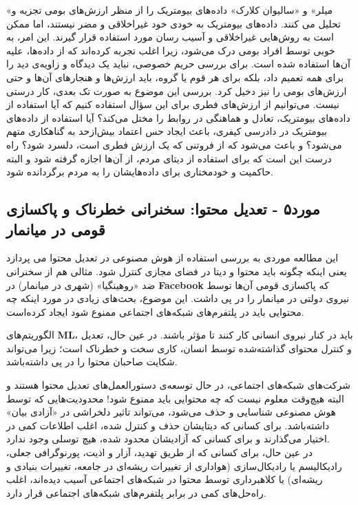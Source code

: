 «میلر» و «سالیوان کلارک» داده‌های بیومتریک را از منظر ارزش‌های بومی تجزیه و تحلیل می کنند.
داده‌های بیومتریک به خودی خود غیراخلاقی و مضر نیستند، اما ممکن است به روش‌هایی غیراخلاقی و آسیب رسان مورد استفاده قرار گیرند.
این امر، به خوبی توسط افراد بومی درک می‌شود، زیرا اغلب تجربه کرده‌اند که از داده‌ها، علیه آن‌ها استفاده شده است.
برای بررسی حریم خصوصی، نباید یک دیدگاه و زاویه‌ی دید را برای همه تعمیم داد، بلکه برای هر قوم یا گروه، باید ارزش‌ها و هنجارهای آن‌ها و حتی ارزش‌های بومی را نیز دخیل کرد.
بررسی این موضوع به صورت تک بعدی، کار درستی نیست.
می‌توانیم از ارزش‌های فطری برای این سؤال استفاده کنیم که آیا استفاده از داده‌های بیومتریک، تعادل و هماهنگی در روابط را مختل می‌کند؟ آیا استفاده از داده‌های بیومتریک در دادرسی کیفری، باعث ایجاد حس اعتماد بیش‌ازحد به گناهکاری متهم می‌شود؟ و باعث می‌شود که از فروتنی که یک ارزش فطری است، دلسرد شود؟ راه درست این است که برای استفاده از دیتای مردم، از آن‌ها اجازه گرفته شود و البته حاکمیت و خودمختاری برای داده‌هایشان را به مردم برگردانده شود.
\newline
\newline

{
\subsection*{مورد۵ - تعدیل محتوا: سخنرانی خطرناک و پاکسازی قومی در میانمار}
\label{subsec:مورد۵ - تعدیل محتوا: سخنرانی خطرناک و پاکسازی قومی در میانمار}
این مطالعه موردی به بررسی استفاده از هوش مصنوعی در تعدیل محتوا می پردازد یعنی اینکه چگونه باید محتوا و دیتا در فضای مجازی کنترل شود.
مثالی هم از سخنرانی ضد «روهینگیا» (شهری در میانمار) در \textenglish{\textbf{Facebook}} که پاکسازی قومی آن‌ها توسط نیروی دولتی در میانمار را در پی داشت.
این موضوع، بحث‌های زیادی در مورد اینکه چه محتوایی باید در پلتفرم‌های شبکه‌های اجتماعی ممنوع شود ایجاد کرده‌است.
}

الگوریتم‌های \textenglish{\textbf{ML}}، باید در کنار نیروی انسانی کار کنند تا مؤثر باشند.
در عین حال، تعدیل و کنترل محتوای گذاشته‌شده توسط انسان، کاری سخت و خطرناک است؛ زیرا می‌تواند شکایت صاحبان محتوا را در پی داشته‌باشد.

شرکت‌های شبکه‌های اجتماعی، در حال توسعه‌ی دستورالعمل‌های تعدیل محتوا هستند و البته هیچ‌وقت معلوم نیست که چه محتوایی باید ممنوع شود!
محدودیت‌هایی که توسط هوش مصنوعی شناسایی و حذف می‌شود، می‌تواند تاثیر دلخراشی در «آزادی بیان» داشته‌باشد.
برای کسانی که دیتایشان حذف و کنترل شده، اغلب اطلاعات کمی در اختیار می‌گذارند و برای کسانی که آزادیشان محدود شده، هیچ توسلی وجود ندارد.
\\
در عین حال، برای کسانی که از طریق تهدید، آزار و اذیت، پورنوگرافی جعلی، رادیکالیسم یا رادیکال‌سازی (هواداری از تغییرات ریشه‌ای در جامعه، تغییرات بنیادی و ریشه‌ای) یا کلاهبرداری توسط محتوا در شبکه‌های اجتماعی آسیب دیده‌اند، اغلب راه‌حل‌های کمی در برابر پلتفرم‌های شبکه‌های اجتماعی قرار دارد.

